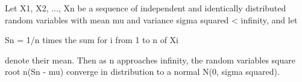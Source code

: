 \documentclass{article}
\begin{document}

Let X1, X2, ..., Xn be a sequence of independent and
identically distributed random variables with
mean mu and variance sigma squared < infinity, 
and let


Sn = 1/n times the sum for i from 1 to n of Xi


denote their mean. Then as n approaches infinity, the
random variables square root n(Sn - mu) converge in
distribution to a normal N(0, sigma squared).

\end{document}
